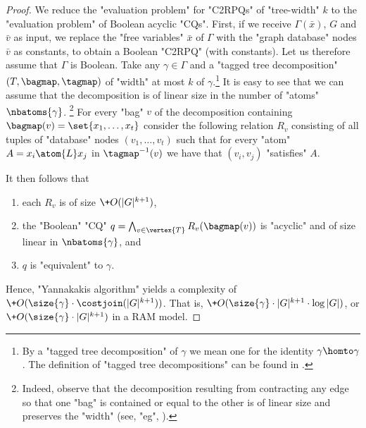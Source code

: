 \begin{proof}
    We reduce the "evaluation problem" for "C2RPQs" of "tree-width" $k$ to the "evaluation problem" of Boolean acyclic "CQs". First, if we receive $\Gamma (\bar x)$, $G$ and $\bar v$ as input, we replace the "free variables" $\bar x$ of $\Gamma$ with the "graph database" nodes $\bar v$ as constants, to obtain a Boolean "C2RPQ" (with constants). Let us therefore assume that $\Gamma$ is Boolean.
	Take any $\gamma \in \Gamma$ and a "tagged tree decomposition" $(T, \bagmap, \tagmap)$ of "width" at most $k$ of $\gamma$.\footnote{By a "tagged tree decomposition" of $\gamma$ we mean one for the identity $\gamma \homto \gamma$. The definition of "tagged tree decompositions" can be found in .}
	It is easy to see that we can assume that the decomposition is of linear size in the number of "atoms" $\nbatoms{\gamma}$.%
	\footnote{
		Indeed, observe that the decomposition resulting from contracting any edge so that one "bag" is contained or equal to the other is of linear size and preserves the "width" (see, "eg", \cite{DBLP:journals/jcss/GottlobLS02}).
	}
	 For every "bag" $v$ of the decomposition containing $\bagmap(v)=\set{x_1, \dotsc, x_t}$ consider the following relation $R_v$ consisting of all tuples of "database" nodes $(v_1, \dotsc, v_t)$ such that for every "atom" $A=x_i \atom{L} x_j$ in $\tagmap^{-1}(v)$ we have that $(v_i, v_j)$ "satisfies" $A$.


    It then follows that 
    \begin{enumerate}
        \item  each $R_v$ is of size $\+O(|G|^{k+1})$, 
        \item the "Boolean" "CQ" $q = \bigwedge_{v \in \vertex{T}} R_v(\bagmap(v))$ is "acyclic" and of size linear in $\nbatoms{\gamma}$, and 
        \item $q$ is "equivalent" to $\gamma$.
    \end{enumerate}
    Hence, "Yannakakis algorithm" yields a complexity of $\+O(\size{\gamma} \cdot \costjoin(|G|^{k+1}))$. That is, $\+O(\size{\gamma} \cdot |G|^{k+1} \cdot \log{|G|})$, or $\+O(\size{\gamma} \cdot |G|^{k+1})$ in a RAM model.


\end{proof}

